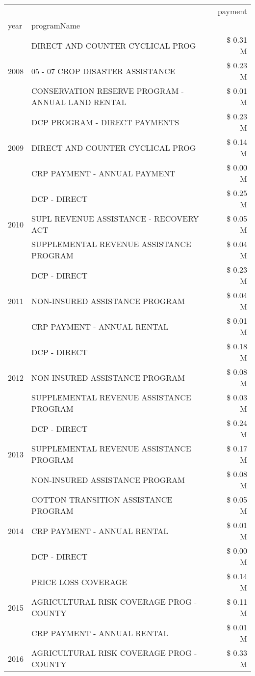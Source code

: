 \begin{tabular}{llr}
\toprule
 &  & payment \\
year & programName &  \\
\midrule
\multirow[t]{3}{*}{2008} & DIRECT AND COUNTER CYCLICAL PROG & \$ 0.31 M \\
 & 05 - 07 CROP DISASTER ASSISTANCE & \$ 0.23 M \\
 & CONSERVATION RESERVE PROGRAM - ANNUAL LAND RENTAL & \$ 0.01 M \\
\cline{1-3}
\multirow[t]{3}{*}{2009} & DCP PROGRAM - DIRECT PAYMENTS & \$ 0.23 M \\
 & DIRECT AND COUNTER CYCLICAL PROG & \$ 0.14 M \\
 & CRP PAYMENT - ANNUAL PAYMENT & \$ 0.00 M \\
\cline{1-3}
\multirow[t]{3}{*}{2010} & DCP - DIRECT & \$ 0.25 M \\
 & SUPL REVENUE ASSISTANCE - RECOVERY ACT & \$ 0.05 M \\
 & SUPPLEMENTAL REVENUE ASSISTANCE PROGRAM & \$ 0.04 M \\
\cline{1-3}
\multirow[t]{3}{*}{2011} & DCP - DIRECT & \$ 0.23 M \\
 & NON-INSURED ASSISTANCE PROGRAM & \$ 0.04 M \\
 & CRP PAYMENT - ANNUAL RENTAL & \$ 0.01 M \\
\cline{1-3}
\multirow[t]{3}{*}{2012} & DCP - DIRECT & \$ 0.18 M \\
 & NON-INSURED ASSISTANCE PROGRAM & \$ 0.08 M \\
 & SUPPLEMENTAL REVENUE ASSISTANCE PROGRAM & \$ 0.03 M \\
\cline{1-3}
\multirow[t]{3}{*}{2013} & DCP - DIRECT & \$ 0.24 M \\
 & SUPPLEMENTAL REVENUE ASSISTANCE PROGRAM & \$ 0.17 M \\
 & NON-INSURED ASSISTANCE PROGRAM & \$ 0.08 M \\
\cline{1-3}
\multirow[t]{3}{*}{2014} & COTTON TRANSITION ASSISTANCE PROGRAM & \$ 0.05 M \\
 & CRP PAYMENT - ANNUAL RENTAL & \$ 0.01 M \\
 & DCP - DIRECT & \$ 0.00 M \\
\cline{1-3}
\multirow[t]{3}{*}{2015} & PRICE LOSS COVERAGE & \$ 0.14 M \\
 & AGRICULTURAL RISK COVERAGE PROG - COUNTY & \$ 0.11 M \\
 & CRP PAYMENT - ANNUAL RENTAL & \$ 0.01 M \\
\cline{1-3}
\multirow[t]{3}{*}{2016} & AGRICULTURAL RISK COVERAGE PROG - COUNTY & \$ 0.33 M \\

\end{tabular}

